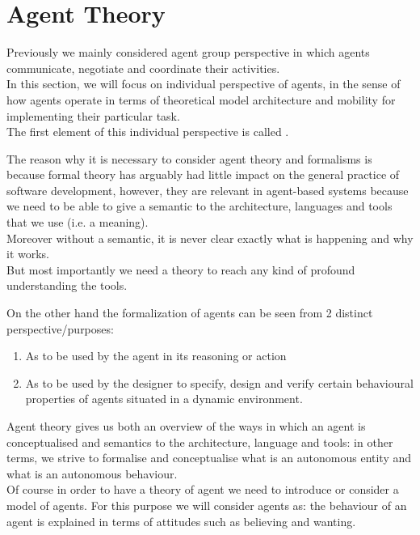\chapter{Agent Theory}
\minitoc

Previously we mainly considered agent group perspective in which agents communicate, negotiate and coordinate their activities.\\
In this section, we will focus on individual perspective of agents, in the sense of how agents operate in terms of theoretical model architecture and mobility for implementing their particular task.\\
The first element of this individual perspective is called .

The reason why it is necessary to consider agent theory and formalisms is because formal theory has arguably had little impact on the general practice of software development, however, they are relevant in agent-based systems because we need to be able to give a semantic to the architecture, languages and tools that we use (i.e. a meaning).\\
Moreover without a semantic, it is never clear exactly what is happening and why it works.\\
But most importantly we need a theory to reach any kind of profound understanding the tools.

On the other hand the formalization of agents can be seen from 2 distinct perspective/purposes:
\begin{enumerate}
\item As  to be used by the agent in its reasoning or action
\item As  to be used by the designer to specify, design and verify certain behavioural properties of agents situated in a dynamic environment.
\end{enumerate}

Agent theory gives us both an overview of the ways in which an agent is conceptualised and semantics to the architecture, language and tools: in other terms, we strive to formalise and conceptualise what is an autonomous entity and what is an autonomous behaviour.\\
Of course in order to have a theory of agent we need to introduce or consider a model of agents. For this purpose we will consider agents as: the behaviour of an agent is explained in terms of attitudes such as believing and wanting.

